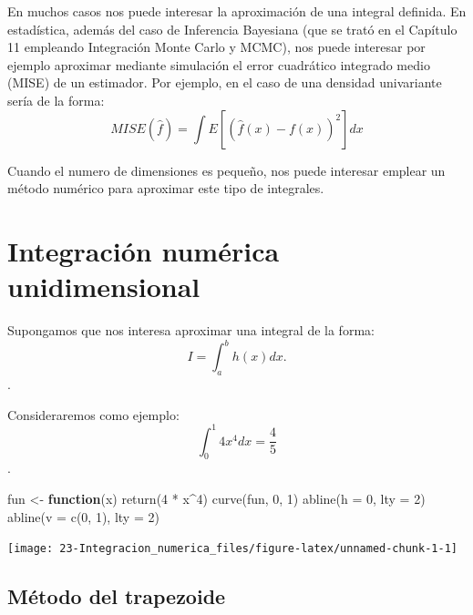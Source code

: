 \documentclass[
]{book}
\newenvironment{Shaded}{\begin{snugshade}}{\end{snugshade}}
\newcommand{\AttributeTok}[1]{\textcolor[rgb]{0.77,0.63,0.00}{#1}}
\newcommand{\ControlFlowTok}[1]{\textcolor[rgb]{0.13,0.29,0.53}{\textbf{#1}}}
\newcommand{\DecValTok}[1]{\textcolor[rgb]{0.00,0.00,0.81}{#1}}
\newcommand{\FunctionTok}[1]{\textcolor[rgb]{0.00,0.00,0.00}{#1}}
\newcommand{\NormalTok}[1]{#1}
\newcommand{\OtherTok}[1]{\textcolor[rgb]{0.56,0.35,0.01}{#1}}
\newcommand{\SpecialCharTok}[1]{\textcolor[rgb]{0.00,0.00,0.00}{#1}}
\theoremstyle{break}
\theoremstyle{nonumberplain}
\begin{document}
En muchos casos nos puede interesar la aproximación de una integral definida.
En estadística, además del caso de Inferencia Bayesiana (que se trató en el Capítulo 11 empleando Integración Monte Carlo y MCMC), nos puede interesar por ejemplo aproximar mediante simulación el error cuadrático integrado medio (MISE) de un estimador.
Por ejemplo, en el caso de una densidad univariante sería de la forma:
\[MISE\left( \hat{f} \right) =\int E\left[ \left( \hat{f}(x) - f(x) \right)^2\right] dx\]

Cuando el numero de dimensiones es pequeño, nos puede interesar emplear un método numérico para aproximar este tipo de integrales.

\hypertarget{integraciuxf3n-numuxe9rica-unidimensional}{%
\section{Integración numérica unidimensional}\label{integraciuxf3n-numuxe9rica-unidimensional}}

Supongamos que nos interesa aproximar una integral de la forma:
\[I = \int_a^b h(x)  dx.\].

Consideraremos como ejemplo:
\[\int_0^1 4x^4 dx = \frac{4}{5}\].

\begin{Shaded}
\begin{Highlighting}[]
\NormalTok{fun }\OtherTok{\textless{}{-}} \ControlFlowTok{function}\NormalTok{(x) }\FunctionTok{return}\NormalTok{(}\DecValTok{4} \SpecialCharTok{*}\NormalTok{ x}\SpecialCharTok{\^{}}\DecValTok{4}\NormalTok{)}
\FunctionTok{curve}\NormalTok{(fun, }\DecValTok{0}\NormalTok{, }\DecValTok{1}\NormalTok{)}
\FunctionTok{abline}\NormalTok{(}\AttributeTok{h =} \DecValTok{0}\NormalTok{, }\AttributeTok{lty =} \DecValTok{2}\NormalTok{)}
\FunctionTok{abline}\NormalTok{(}\AttributeTok{v =} \FunctionTok{c}\NormalTok{(}\DecValTok{0}\NormalTok{, }\DecValTok{1}\NormalTok{), }\AttributeTok{lty =} \DecValTok{2}\NormalTok{)}
\end{Highlighting}
\end{Shaded}

\begin{center}\texttt{[image: 23-Integracion\_numerica\_files/figure-latex/unnamed-chunk-1-1]} \end{center}

\hypertarget{muxe9todo-del-trapezoide}{%
\subsection{Método del trapezoide}\label{muxe9todo-del-trapezoide}}
\end{document}
